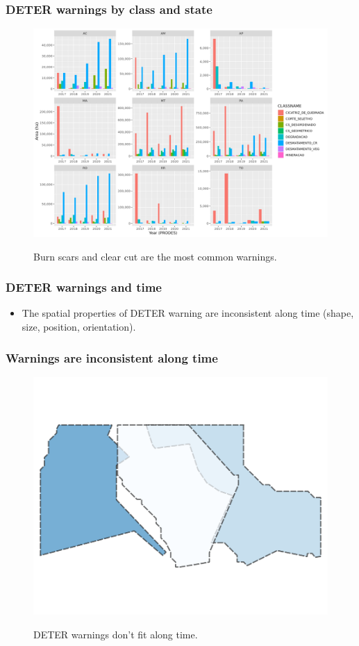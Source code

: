 \documentclass[aspectratio=169]{beamer}
\begin{document}
\begin{frame}
    \frametitle{DETER warnings by class and state}
    \begin{figure}[h]
        \includegraphics[width=0.65\linewidth]
        {./figures/plot_deter_area_by_class_state.png}
        \label{fig:deter_area_by_class_state}
        \caption{Burn scars and clear cut are the most common warnings.}
    \end{figure}
\end{frame}


\begin{frame}
    \frametitle{DETER warnings and time}
    \begin{itemize}
        \item The spatial properties of DETER warning are inconsistent along 
            time (shape, size, position, orientation).
    \end{itemize}
\end{frame}

\begin{frame}
    \frametitle{Warnings are inconsistent along time}
    \begin{figure}[h] 
        \includegraphics[width=0.60\linewidth]
        {./images/sample_deter_warnings.png}
        \label{fig:deter_subareas}
        \caption{DETER warnings don't fit along time.}
    \end{figure}
\end{frame}
\end{document}
